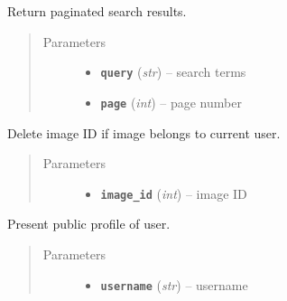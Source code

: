 \documentclass[letterpaper,10pt,english]{sphinxmanual}
\begin{document}
\begin{fulllineitems}
\label{users:get--user-search_results-(query)}
Return paginated search results.
\begin{quote}\begin{description}
\item[{Parameters}] \leavevmode\begin{itemize}
\item {} 
\textbf{\texttt{query}} (\emph{str}) -- search terms

\item {} 
\textbf{\texttt{page}} (\emph{int}) -- page number

\end{itemize}

\end{description}\end{quote}

\end{fulllineitems}



\begin{fulllineitems}
\label{users:get--user-remove-photo-(int-image_id)}
Delete image ID if image belongs to current user.
\begin{quote}\begin{description}
\item[{Parameters}] \leavevmode\begin{itemize}
\item {} 
\textbf{\texttt{image\_id}} (\emph{int}) -- image ID

\end{itemize}

\end{description}\end{quote}

\end{fulllineitems}



\begin{fulllineitems}
\label{users:get--user-view-profile-(username)}
Present public profile of user.
\begin{quote}\begin{description}
\item[{Parameters}] \leavevmode\begin{itemize}
\item {} 
\textbf{\texttt{username}} (\emph{str}) -- username

\end{itemize}

\end{description}\end{quote}

\end{fulllineitems}
\end{document}
